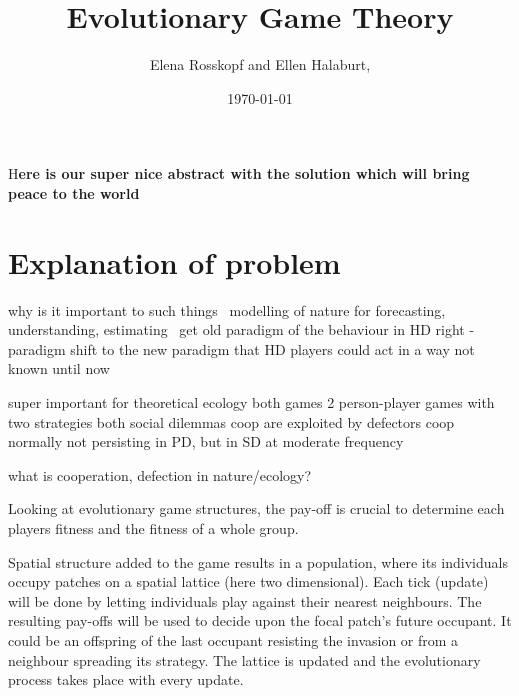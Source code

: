 \documentclass[DIV=calc, paper=a4, fontsize=11pt, twocolumn]{scrartcl}	 %
\title{Evolutionary Game Theory} %
\author{Elena Rosskopf and Ellen Halaburt, } %
\date{\today} %
\newcommand{\initial}[1]{ %
\lettrine[lines=3,lhang=0.3,nindent=0em]{
\color{DarkGoldenrod}
{\textsf{#1}}}{}}
\begin{document}
\maketitle %

\thispagestyle{fancy} %


\initial{H}\textbf{ere is our super nice abstract with the solution which will bring peace to the world}


\section*{Explanation of problem}

\noindent why is it important to such things \
modelling of nature for forecasting, understanding, estimating  \
get old paradigm of the behaviour in HD right - paradigm shift to the new paradigm that HD players could act in a way not known until now

super important for theoretical ecology
both games 2 person-player games with two strategies 
both social dilemmas 
coop are exploited by defectors 
coop normally not persisting in PD, but in SD at moderate frequency

what is cooperation, defection in nature/ecology? 


Looking at evolutionary game structures, the pay-off is crucial to determine each players fitness and the fitness of a whole group. 

Spatial structure added to the game results in a population, where its individuals occupy patches on a spatial lattice (here two dimensional). 
Each tick (update) will be done by letting individuals play against their nearest neighbours. The resulting pay-offs will be used to decide upon the focal patch's future occupant. It could be an offspring of the last occupant resisting the invasion or from a neighbour spreading its strategy. The lattice is updated and the evolutionary process takes place with every update.
\end{document}
